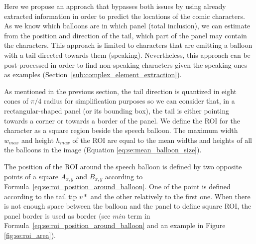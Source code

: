 Here we propose an approach that bypasses both issues by using already extracted information in order to predict the locations of the comic characters.
As we know which balloons are in which panel (total inclusion), we can estimate from the position and direction of the tail, which part of the panel may contain the characters.
This approach is limited to characters that are emitting a balloon with a tail directed towards them (speaking).
Nevertheless, this approach can be post-processed in order to find non-speaking characters given the speaking ones as examples (Section~\ref{sub:complex_element_extraction}).

As mentioned in the previous section, the tail direction is quantized in eight cones of $\pi/4$ radius for simplification purposes so we can consider that, in a rectangular-shaped panel (or its bounding box), the tail is either pointing towards a corner or towards a border of the panel.
We define the ROI for the character as a square region beside the speech balloon.
The maximum width $w_{max}$ and height $h_{max}$ of the ROI are equal to the mean widths and heights of all the balloons in the image (Equation \ref{eq:se:mean_balloon_size}).

The position of the ROI around the speech balloon is defined by two opposite points of a square $A_{x,y}$ and $B_{x,y}$ according to Formula~\ref{eq:se:roi_position_around_balloon}.
One of the point is defined according to the tail tip $v*$ and the other relatively to the first one.
When there is not enough space between the balloon and the panel to define square ROI, the panel border is used as border (see $min$ term in Formula~\ref{eq:se:roi_position_around_balloon} and an example in Figure \ref{fig:se:roi_area}).

